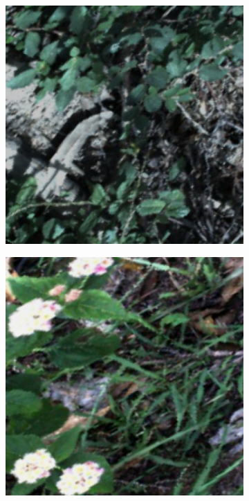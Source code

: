 \begin{figure}[h]
\begin{subfigure}{0.3\textwidth}
        \caption{}
    \end{subfigure}
    \hfill
    \begin{subfigure}{0.3\textwidth}
        \includegraphics[width=\textwidth]{figuras/implementacion/dataset/imagenes_datagen_4.png}
        \caption{}
    \end{subfigure}
    \hfill
    \begin{subfigure}{0.3\textwidth}
        \includegraphics[width=\textwidth]{figuras/implementacion/dataset/imagenes_datagen_5.png}

\end{subfigure}
\end{figure}
